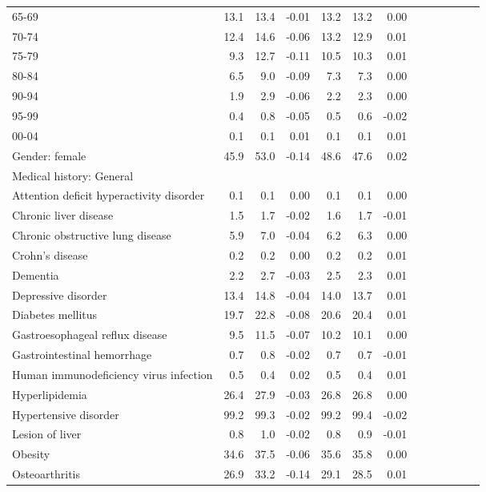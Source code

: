 \documentclass[11pt,]{article}
\begin{document}
\begin{longtable}{lrrrrrrrrrrrr}
      65-69 & 13.1 & 13.4 & -0.01 & 13.2 & 13.2 &  0.00 \\ 
      70-74 & 12.4 & 14.6 & -0.06 & 13.2 & 12.9 &  0.01 \\ 
      75-79 &  9.3 & 12.7 & -0.11 & 10.5 & 10.3 &  0.01 \\ 
      80-84 &  6.5 &  9.0 & -0.09 &  7.3 &  7.3 &  0.00 \\ 
      90-94 &  1.9 &  2.9 & -0.06 &  2.2 &  2.3 &  0.00 \\ 
      95-99 &  0.4 &  0.8 & -0.05 &  0.5 &  0.6 & -0.02 \\ 
      00-04 &  0.1 &  0.1 &  0.01 &  0.1 &  0.1 &  0.01 \\ 
  Gender: female & 45.9 & 53.0 & -0.14 & 48.6 & 47.6 &  0.02 \\ 
  Medical history: General &    &    &     &    &    &     \\ 
      Attention deficit hyperactivity disorder &  0.1 &  0.1 &  0.00 &  0.1 &  0.1 &  0.00 \\ 
      Chronic liver disease &  1.5 &  1.7 & -0.02 &  1.6 &  1.7 & -0.01 \\ 
      Chronic obstructive lung disease &  5.9 &  7.0 & -0.04 &  6.2 &  6.3 &  0.00 \\ 
      Crohn's disease &  0.2 &  0.2 &  0.00 &  0.2 &  0.2 &  0.01 \\ 
      Dementia &  2.2 &  2.7 & -0.03 &  2.5 &  2.3 &  0.01 \\ 
      Depressive disorder & 13.4 & 14.8 & -0.04 & 14.0 & 13.7 &  0.01 \\ 
      Diabetes mellitus & 19.7 & 22.8 & -0.08 & 20.6 & 20.4 &  0.01 \\ 
      Gastroesophageal reflux disease &  9.5 & 11.5 & -0.07 & 10.2 & 10.1 &  0.00 \\ 
      Gastrointestinal hemorrhage &  0.7 &  0.8 & -0.02 &  0.7 &  0.7 & -0.01 \\ 
      Human immunodeficiency virus infection &  0.5 &  0.4 &  0.02 &  0.5 &  0.4 &  0.01 \\ 
      Hyperlipidemia & 26.4 & 27.9 & -0.03 & 26.8 & 26.8 &  0.00 \\ 
      Hypertensive disorder & 99.2 & 99.3 & -0.02 & 99.2 & 99.4 & -0.02 \\ 
      Lesion of liver &  0.8 &  1.0 & -0.02 &  0.8 &  0.9 & -0.01 \\ 
      Obesity & 34.6 & 37.5 & -0.06 & 35.6 & 35.8 &  0.00 \\ 
      Osteoarthritis & 26.9 & 33.2 & -0.14 & 29.1 & 28.5 &  0.01 \\ 

\end{longtable}
\end{document}
